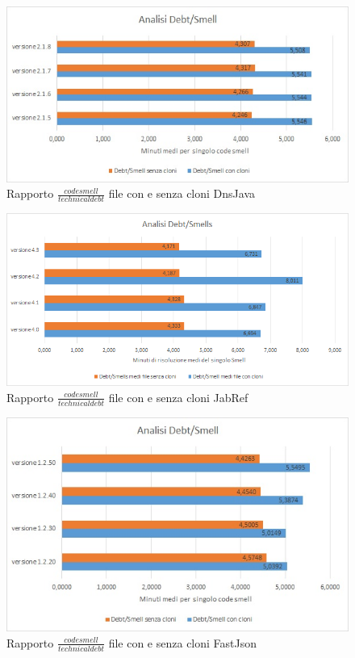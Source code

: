 \begin{figure}[h]
	\centering
	\includegraphics[scale=0.7, trim = 0cm 0cm 0cm 0cm, clip=true]{Grafici_dnsJava/Debt-Smells.jpg}
	\caption{Rapporto $\frac{code smell}{technical debt}$ file con e senza cloni DnsJava}
	\label{fig:rapDnsJava}	
\end{figure}
\begin{figure}[h]
	\centering
	\includegraphics[scale=0.7, trim = 0cm 0cm 0cm 0cm, clip=true]{Grafici_jabRef/Debt-Smells.png}
	\caption{Rapporto $\frac{code smell}{technical debt}$ file con e senza cloni JabRef}
	\label{fig:rapJabRef}
\end{figure}
\begin{figure}[h]
	\centering
	\includegraphics[scale=0.7, trim = 0cm 0cm 0cm 0cm, clip=true]{Grafici_fastJson/Debt-Smell.jpg}
	\caption{Rapporto $\frac{code smell}{technical debt}$ file con e senza cloni FastJson}
	\label{fig:rapFastjson}
\end{figure}
